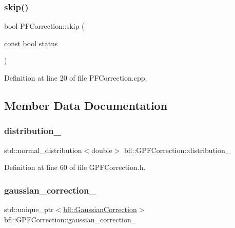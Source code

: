 \subsubsection{\texorpdfstring{skip()}{skip()}}
{\footnotesize\ttfamily bool P\+F\+Correction\+::skip (\begin{DoxyParamCaption}\item[{const bool}]{status }\end{DoxyParamCaption})\hspace{0.3cm}{\ttfamily [inherited]}}



Definition at line 20 of file P\+F\+Correction.\+cpp.



\subsection{Member Data Documentation}
\mbox{\label{classbfl_1_1GPFCorrection_a9d2f1ed3b529e340e5d019d80e572d8d}} 
\subsubsection{\texorpdfstring{distribution\+\_\+}{distribution\_}}
{\footnotesize\ttfamily std\+::normal\+\_\+distribution$<$double$>$ bfl\+::\+G\+P\+F\+Correction\+::distribution\+\_\+\hspace{0.3cm}{\ttfamily [protected]}}



Definition at line 60 of file G\+P\+F\+Correction.\+h.

\mbox{\label{classbfl_1_1GPFCorrection_a43295a0619fa021b6b314c76f046bae8}} 
\subsubsection{\texorpdfstring{gaussian\+\_\+correction\+\_\+}{gaussian\_correction\_}}
{\footnotesize\ttfamily std\+::unique\+\_\+ptr$<$\mbox{\hyperlink{classbfl_1_1GaussianCorrection}{bfl\+::\+Gaussian\+Correction}}$>$ bfl\+::\+G\+P\+F\+Correction\+::gaussian\+\_\+correction\+\_\+\hspace{0.3cm}{\ttfamily [protected]}}



